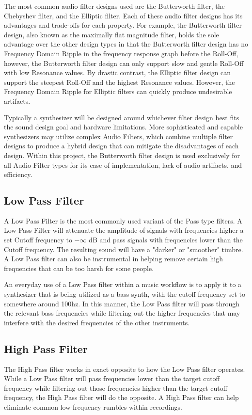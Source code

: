 \documentclass[a4paper,12pt]{report}
\begin{document}
The most common audio filter designs used are the Butterworth filter, the Chebyshev filter, and the Elliptic filter. Each of these audio filter designs has its advantages and trade-offs for each property. For example, the Butterworth filter design, also known as the maximally flat magnitude filter, holds the sole advantage over the other design types in that the Butterworth filter design has no Frequency Domain Ripple in the frequency response graph before the Roll-Off, however, the Butterworth filter design can only support slow and gentle Roll-Off with low Resonance values. By drastic contrast, the Elliptic filter design can support the steepest Roll-Off and the highest Resonance values. However, the Frequency Domain Ripple for Elliptic filters can quickly produce undesirable artifacts.

Typically a synthesizer will be designed around whichever filter design best fits the sound design goal and hardware limitations. More sophisticated and capable synthesizers may utilize complex Audio Filters, which combine multiple filter designs to produce a hybrid design that can mitigate the disadvantages of each design. Within this project, the Butterworth filter design is used exclusively for all Audio Filter types for its ease of implementation, lack of audio artifacts, and efficiency.

\subsection{Low Pass Filter}
\label{subsec:lowpassfilter}
A Low Pass Filter is the most commonly used variant of the Pass type filters. A Low Pass Filter will attenuate the amplitude of signals with frequencies higher a set Cutoff frequency to $-\infty$ dB and pass signals with frequencies lower than the Cutoff frequency. The resulting sound will have a "darker" or "smoother" timbre. A Low Pass filter can also be instrumental in helping remove certain high frequencies that can be too harsh for some people.

An everyday use of a Low Pass filter within a music workflow is to apply it to a synthesizer that is being utilized as a bass synth, with the cutoff frequency set to somewhere around 100hz. In this manner, the Low Pass filter will pass through the relevant bass frequencies while filtering out the higher frequencies that may interfere with the desired frequencies of the other instruments.

\subsection{High Pass Filter}
\label{subsec:highpassfilter}
The High Pass filter works in exact opposite to how the Low Pass filter operates. While a Low Pass filter will pass frequencies lower than the target cutoff frequency while filtering out those frequencies higher than the target cutoff frequency, the High Pass filter will do the opposite. A High Pass filter can help eliminate common low-frequency rumbles within recordings.
\end{document}
